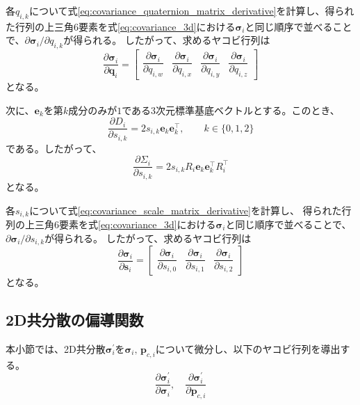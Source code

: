 \documentclass[dvipdfmx]{jlreq}
\begin{document}
各$q_{i,k}$について式\eqref{eq:covariance_quaternion_matrix_derivative}を計算し、得られた行列の上三角6要素を式\eqref{eq:covariance_3d}における$\bm{\sigma}_i$と同じ順序で並べることで、$\partial\bm{\sigma}_i/\partial q_{i,k}$が得られる。
したがって、求めるヤコビ行列は
\begin{equation}
    \frac{\partial\bm{\sigma}_i}{\partial\bm{q}_i}
    =
    \begin{bmatrix}
        \dfrac{\partial\bm{\sigma}_i}{\partial q_{i,w}} &
        \dfrac{\partial\bm{\sigma}_i}{\partial q_{i,x}} &
        \dfrac{\partial\bm{\sigma}_i}{\partial q_{i,y}} &
        \dfrac{\partial\bm{\sigma}_i}{\partial q_{i,z}}
    \end{bmatrix}
    \label{eq:covariance_quaternion_jacobian}
\end{equation}
となる。

次に、$\bm{e}_k$を第$k$成分のみが$1$である3次元標準基底ベクトルとする。このとき、
\begin{equation}
    \frac{\partial D_i}{\partial s_{i,k}} = 2s_{i,k}\bm{e}_k\bm{e}_k^{\top}, \qquad k\in\{0,1,2\}
    \label{eq:scale_squared_matrix_derivative}
\end{equation}
である。したがって、
\begin{equation}
    \frac{\partial\Sigma_i}{\partial s_{i,k}} = 2s_{i,k} R_i\bm{e}_k\bm{e}_k^{\top}R_i^{\top}
    \label{eq:covariance_scale_matrix_derivative}
\end{equation}
となる。

各$s_{i,k}$について式\eqref{eq:covariance_scale_matrix_derivative}を計算し、
得られた行列の上三角6要素を式\eqref{eq:covariance_3d}における$\bm{\sigma}_i$と同じ順序で並べることで、
$\partial\bm{\sigma}_i/\partial s_{i,k}$が得られる。
したがって、求めるヤコビ行列は
\begin{equation}
    \frac{\partial\bm{\sigma}_i}{\partial\bm{s}_i}
    =
    \begin{bmatrix}
        \dfrac{\partial\bm{\sigma}_i}{\partial s_{i,0}} &
        \dfrac{\partial\bm{\sigma}_i}{\partial s_{i,1}} &
        \dfrac{\partial\bm{\sigma}_i}{\partial s_{i,2}}
    \end{bmatrix}
    \label{eq:covariance_scale_jacobian}
\end{equation}
となる。

\subsection{2D共分散の偏導関数}
本小節では、2D共分散$\bm{\sigma}_i^{\prime}$を$\bm{\sigma}_i,\,\bm{p}_{c,i}$について微分し、以下のヤコビ行列を導出する。
\begin{equation*}
    \frac{\partial\bm{\sigma}_i^{\prime}}{\partial\bm{\sigma}_i}, \quad \frac{\partial\bm{\sigma}_i^{\prime}}{\partial\bm{p}_{c,i}}
\end{equation*}
\end{document}
